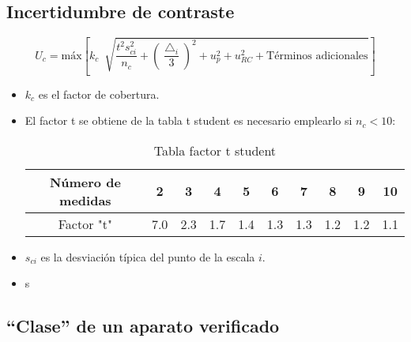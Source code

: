 \subsection{Incertidumbre de contraste}
\[U_c = \text{máx} \left[{k_c \ \sqrt[]{\frac{t^2 s_{ci}^2}{n_c}+\left({\frac{\bigtriangleup_i}{3}}\right)^2+u_p^2+u_{RC}^2+\text{Términos adicionales}}}\right]\]

\begin{itemize}
\item $k_c$ es el factor de cobertura.

	\item El factor t se obtiene de la tabla t student es necesario emplearlo si $n_c < 10$:
\renewcommand{\arraystretch}{1.1} %
\begin{table}[H]
	\centering
	\begin{tabular}{|c|c|c|c|c|c|c|c|c|c|}
		\hline
		\textbf{Número de medidas} & \textbf{2} & \textbf{3} & \textbf{4} & \textbf{5} & \textbf{6} & \textbf{7}
		& \textbf{8} & \textbf{9} & \textbf{10} \\
		\hline
		Factor "t"& 7.0 & 2.3 & 1.7 & 1.4 & 1.3 & 1.3 & 1.2
		& 1.2 & 1.1  \\
		\hline
	\end{tabular}
	\caption{Tabla factor t student}
	\label{tab:example}
\end{table}

\item $s_{ci}$ es la desviación típica del punto de la escala $i$.
\item s

\end{itemize}



\subsection{“Clase” de un aparato verificado}




